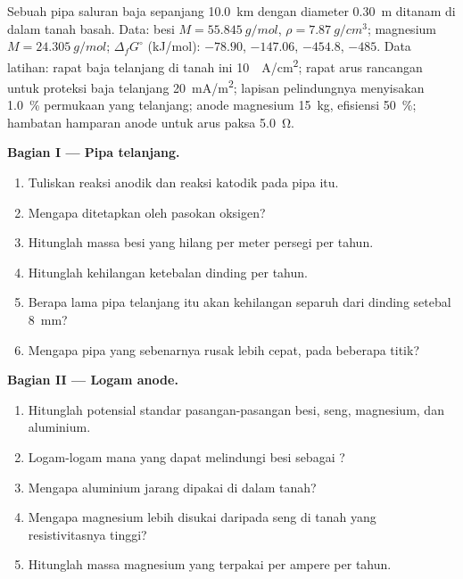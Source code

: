 \begin{problem}
\label{pb:b2:corrosion:1}
Sebuah pipa saluran baja sepanjang \qty{10.0}{km} dengan diameter
\qty{0.30}{m} ditanam di dalam tanah basah. Data: besi
$M = \qty{55.845}{g/mol}$, $\rho = \qty{7.87}{g/cm^3}$; magnesium
$M = \qty{24.305}{g/mol}$; $\Delta_f G^\circ$ (\unit{kJ/mol}): 
$-78.90$,  $-147.06$,  $-454.8$,  $-485$. Data
latihan: rapat  baja telanjang di tanah ini \qty{10}{\micro
A/cm^2}; rapat arus rancangan untuk proteksi baja telanjang
\qty{20}{mA/m^2}; lapisan pelindungnya menyisakan 1.0~\% permukaan yang
telanjang; anode magnesium \qty{15}{kg}, efisiensi 50~\%; hambatan hamparan
anode untuk arus paksa \qty{5.0}{\ohm}.

\medskip
\noindent\textbf{Bagian I --- Pipa telanjang.}
\begin{enumerate}
  \item Tuliskan reaksi anodik dan reaksi katodik pada pipa itu.
  \item Mengapa  ditetapkan oleh pasokan oksigen?
  \item Hitunglah massa besi yang hilang per meter persegi per tahun.
  \item Hitunglah kehilangan ketebalan dinding per tahun.
  \item Berapa lama pipa telanjang itu akan kehilangan separuh dari dinding
        setebal \qty{8}{mm}?
  \item Mengapa pipa yang sebenarnya rusak lebih cepat, pada beberapa
        titik?
\end{enumerate}

\medskip
\noindent\textbf{Bagian II --- Logam anode.}
\begin{enumerate}[resume]
  \item Hitunglah potensial standar pasangan-pasangan besi, seng,
        magnesium, dan aluminium.
  \item Logam-logam mana yang dapat melindungi besi sebagai ?
  \item Mengapa aluminium jarang dipakai di dalam tanah?
  \item Mengapa magnesium lebih disukai daripada seng di tanah yang
        resistivitasnya tinggi?
  \item Hitunglah massa magnesium yang terpakai per ampere per tahun.
\end{enumerate}


\end{problem}
